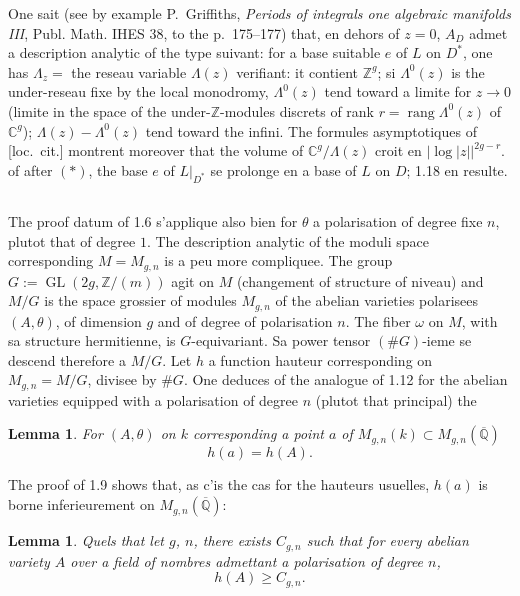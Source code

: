 \documentclass[12pt,a4paper]{article}
\theoremstyle{plain}
\newtheorem{lemma}[theorem]{Lemma}
\theoremstyle{definition}
\theoremstyle{remark}
\DeclareMathOperator{\GL}{GL}
\DeclareMathOperator{\rank}{rang}
\newcommand{\CC}{\mathbb{C}}
\newcommand{\QQ}{\mathbb{Q}}
\newcommand{\ZZ}{\mathbb{Z}}
\providecommand{\CC}{\mathbb{C}}
\providecommand{\QQ}{\mathbb{Q}}
\providecommand{\ZZ}{\mathbb{Z}}
\providecommand{\GL}{\operatorname{GL}}
\providecommand{\rank}{\operatorname{rank}}
\begin{document}
One sait (see by example P.~Griffiths, \textit{Periods of integrals one algebraic manifolds III}, Publ. Math. IHES 38, to the p.~175--177) that, en dehors of $z = 0$, $A_D$ admet a description analytic of the type suivant: for a base suitable $e$ of $L$ on $D^*$, one has $\Lambda_z =$ the reseau variable $\Lambda(z)$ verifiant: it contient $\ZZ^g$; si $\Lambda^0(z)$ is the under-reseau fixe by the local monodromy, $\Lambda^0(z)$ tend toward a limite for $z \to 0$ (limite in the space of the under-$\ZZ$-modules discrets of rank $r = \rank \Lambda^0(z)$ of $\CC^g$); $\Lambda(z) - \Lambda^0(z)$ tend toward the infini. The formules asymptotiques of [loc.\ cit.] montrent moreover that the volume of $\CC^g/\Lambda(z)$ croit en $|\log|z||^{2g-r}$. of after $(*)$, the base $e$ of $L|_{D^*}$ se prolonge en a base of $L$ on $D$; 1.18 en resulte.

\subsection{}

The proof datum of 1.6 s'applique also bien for $\theta$ a polarisation of degree fixe $n$, plutot that of degree $1$. The description analytic of the moduli space corresponding $M = M_{g,n}$ is a peu more compliquee. The group $G := \GL(2g, \ZZ/(m))$ agit on $M$ (changement of structure of niveau) and $M/G$ is the space grossier of modules $M_{g,n}$ of the abelian varieties polarisees $(A,\theta)$, of dimension $g$ and of degree of polarisation $n$. The fiber $\omega$ on $M$, with sa structure hermitienne, is $G$-equivariant. Sa power tensor $(\#G)$-ieme se descend therefore a $M/G$. Let $h$ a function hauteur corresponding on $M_{g,n} = M/G$, divisee by $\#G$. One deduces of the analogue of 1.12 for the abelian varieties equipped with a polarisation of degree $n$ (plutot that principal) the

\begin{lemma}
For $(A,\theta)$ on $k$ corresponding a point $a$ of $M_{g,n}(k) \subset M_{g,n}(\overline{\QQ})$
\[
h(a) = h(A).
\]
\end{lemma}

The proof of 1.9 shows that, as c'is the cas for the hauteurs usuelles, $h(a)$ is borne inferieurement on $M_{g,n}(\overline{\QQ})$:

\begin{lemma}
Quels that let $g$, $n$, there exists $C_{g,n}$ such that for every abelian variety $A$ over a field of nombres admettant a polarisation of degree $n$,
\[
h(A) \geq C_{g,n}.
\]
\end{lemma}
\end{document}
